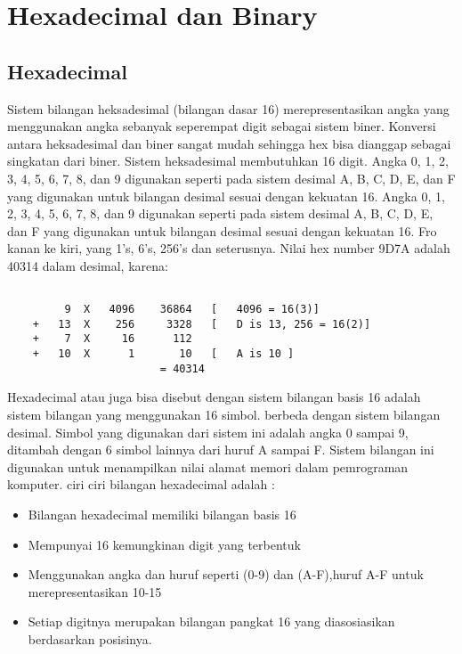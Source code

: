 
\section {Hexadecimal dan Binary}

\subsection {Hexadecimal}
Sistem bilangan heksadesimal (bilangan dasar 16) merepresentasikan angka yang menggunakan angka sebanyak seperempat digit sebagai sistem biner. Konversi antara heksadesimal dan biner sangat mudah sehingga hex bisa dianggap sebagai singkatan dari biner. Sistem heksadesimal membutuhkan 16 digit. Angka 0, 1, 2, 3, 4, 5, 6, 7, 8, dan 9 digunakan seperti pada sistem desimal A, B, C, D, E, dan F yang digunakan untuk bilangan desimal sesuai dengan kekuatan 16. Angka 0, 1, 2, 3, 4, 5, 6, 7, 8, dan 9 digunakan seperti pada sistem desimal A, B, C, D, E, dan F yang digunakan untuk bilangan desimal sesuai dengan kekuatan 16. Fro kanan ke kiri, yang 1's, 6's, 256's dan seterusnya. Nilai hex number 9D7A adalah 40314 dalam desimal, karena:
	\begin{verbatim}

		 9	X	4096	36864	[	4096 = 16(3)]
	+	13	X	 256	 3328	[	D is 13, 256 = 16(2)]
	+	 7	X	  16	  112
	+	10	X	   1	   10	[	A is 10	]
						= 40314
	\end{verbatim}
Hexadecimal atau juga bisa disebut dengan sistem bilangan basis 16 adalah sistem bilangan yang menggunakan 16 simbol. berbeda dengan sistem bilangan desimal. Simbol yang digunakan dari sistem ini adalah angka 0 sampai 9, ditambah dengan 6 simbol lainnya dari huruf A sampai F. Sistem bilangan ini digunakan untuk menampilkan nilai alamat memori dalam pemrograman komputer\cite{hutahaean2015konsep}.
ciri ciri bilangan hexadecimal adalah :

	\begin{itemize}
		\item Bilangan hexadecimal memiliki bilangan basis 16
		\item Mempunyai 16 kemungkinan digit yang terbentuk
		\item Menggunakan angka dan huruf seperti (0-9) dan (A-F),huruf A-F untuk merepresentasikan 10-15
		\item Setiap digitnya merupakan bilangan pangkat 16 yang diasosiasikan berdasarkan posisinya.
	\end{itemize}

